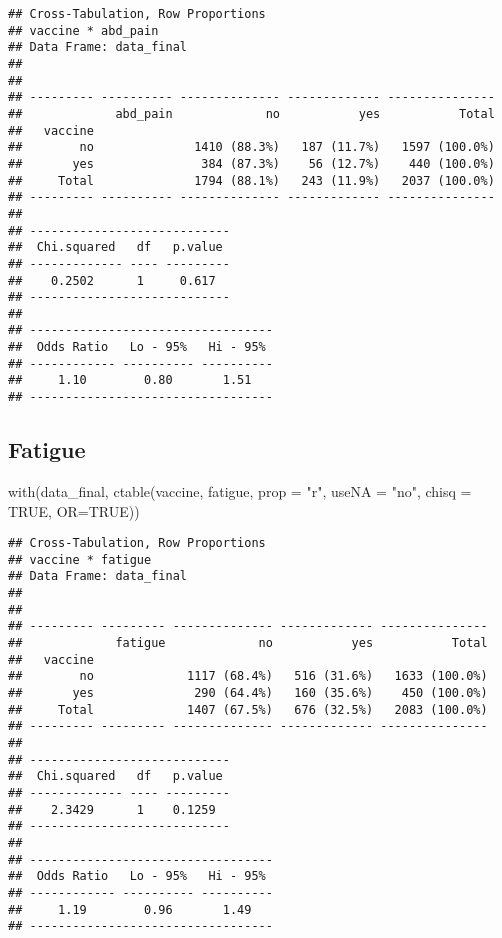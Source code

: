 \documentclass[
]{article}
\newenvironment{Shaded}{\begin{snugshade}}{\end{snugshade}}
\newcommand{\AttributeTok}[1]{\textcolor[rgb]{0.77,0.63,0.00}{#1}}
\newcommand{\ConstantTok}[1]{\textcolor[rgb]{0.00,0.00,0.00}{#1}}
\newcommand{\FunctionTok}[1]{\textcolor[rgb]{0.00,0.00,0.00}{#1}}
\newcommand{\NormalTok}[1]{#1}
\newcommand{\StringTok}[1]{\textcolor[rgb]{0.31,0.60,0.02}{#1}}
\begin{document}
\begin{verbatim}
## Cross-Tabulation, Row Proportions  
## vaccine * abd_pain  
## Data Frame: data_final  
## 
## 
## --------- ---------- -------------- ------------- ---------------
##             abd_pain             no           yes           Total
##   vaccine                                                        
##        no              1410 (88.3%)   187 (11.7%)   1597 (100.0%)
##       yes               384 (87.3%)    56 (12.7%)    440 (100.0%)
##     Total              1794 (88.1%)   243 (11.9%)   2037 (100.0%)
## --------- ---------- -------------- ------------- ---------------
## 
## ----------------------------
##  Chi.squared   df   p.value 
## ------------- ---- ---------
##    0.2502      1     0.617  
## ----------------------------
## 
## ----------------------------------
##  Odds Ratio   Lo - 95%   Hi - 95% 
## ------------ ---------- ----------
##     1.10        0.80       1.51   
## ----------------------------------
\end{verbatim}

\hypertarget{fatigue}{%
\subsection{Fatigue}\label{fatigue}}

\begin{Shaded}
\begin{Highlighting}[]
\FunctionTok{with}\NormalTok{(data\_final, }\FunctionTok{ctable}\NormalTok{(vaccine, fatigue, }\AttributeTok{prop =} \StringTok{"r"}\NormalTok{, }\AttributeTok{useNA =} \StringTok{"no"}\NormalTok{, }\AttributeTok{chisq =} \ConstantTok{TRUE}\NormalTok{, }\AttributeTok{OR=}\ConstantTok{TRUE}\NormalTok{))}
\end{Highlighting}
\end{Shaded}

\begin{verbatim}
## Cross-Tabulation, Row Proportions  
## vaccine * fatigue  
## Data Frame: data_final  
## 
## 
## --------- --------- -------------- ------------- ---------------
##             fatigue             no           yes           Total
##   vaccine                                                       
##        no             1117 (68.4%)   516 (31.6%)   1633 (100.0%)
##       yes              290 (64.4%)   160 (35.6%)    450 (100.0%)
##     Total             1407 (67.5%)   676 (32.5%)   2083 (100.0%)
## --------- --------- -------------- ------------- ---------------
## 
## ----------------------------
##  Chi.squared   df   p.value 
## ------------- ---- ---------
##    2.3429      1    0.1259  
## ----------------------------
## 
## ----------------------------------
##  Odds Ratio   Lo - 95%   Hi - 95% 
## ------------ ---------- ----------
##     1.19        0.96       1.49   
## ----------------------------------
\end{verbatim}
\end{document}

